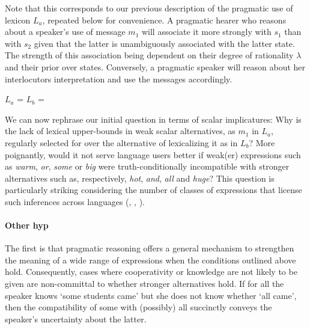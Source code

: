 \documentclass[a4paper]{article}
\newcommand{\hl}[1]{\textcolor[rgb]{.8,.33,.0}{#1}}%
\begin{document}
Note that this corresponds to our previous description of the pragmatic use of lexicon $L_a$, repeated below for convenience. A pragmatic hearer who reasons about a speaker's use of message $m_1$ will associate it more strongly with $s_1$ than with $s_2$ given that the latter is unambiguously associated with the latter state. The strength of this association being dependent on their degree of rationality $\lambda$ and their prior over states. Conversely, a pragmatic speaker will reason about her interlocutors interpretation and use the messages accordingly. 

\begin{centering}
$L_a$ =  \hspace{2cm} $L_b$ = \\[0.5cm]
\end{centering}

We can now rephrase our initial question in terms of scalar implicatures: Why is the lack of lexical upper-bounds in weak scalar alternatives, as $m_1$ in $L_a$, regularly selected for over the alternative of lexicalizing it as in $L_b$? More poignantly, would it not serve language users better if weak(er) expressions such as {\em warm}, {\em or}, {\em some} or {\em big} were truth-conditionally incompatible with stronger alternatives such as, respectively, {\em hot}, {\em and}, {\em all} and {\em huge}?  This question is particularly striking considering the number of classes of expressions that license such inferences across languages (\citealt{horn:1972}, \citealt[252-267]{horn:1984}, \citealt{traugott:2004,vdAuwera:2010}). 

\paragraph{Other hyp}
\hl{The first is that pragmatic reasoning offers a general mechanism to strengthen the meaning of a wide range of expressions when the conditions outlined above hold.   Consequently,  cases where cooperativity or  knowledge  are  not  likely  to  be  given  are  non-committal to whether stronger alternatives hold.  If for all the speaker knows ‘some students came’ but she does not know whether ‘all came’, then the compatibility of some with (possibly) all
succinctly conveys the speaker’s uncertainty about the latter.}
\end{document}
